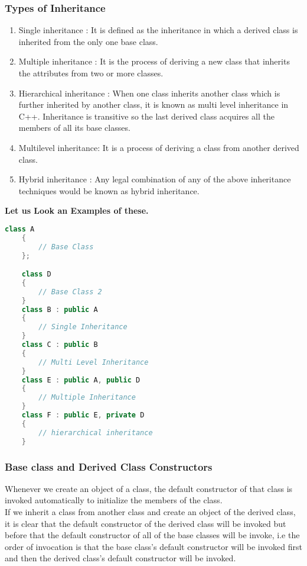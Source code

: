 \documentclass[11pt]{article}
\begin{document}
\subsubsection{Types of Inheritance}

\begin{enumerate}
	\item Single inheritance :
	      It is defined as the inheritance in which a derived class is inherited from the only one base class.
	\item Multiple inheritance : It is the process of deriving a new class that inherits the attributes from two or more classes.
	\item Hierarchical inheritance : When one class inherits another class which is further inherited by another class, it is known as multi level inheritance in C++. Inheritance is transitive so the last derived class acquires all the members of all its base classes.
	\item Multilevel inheritance: It is a process of deriving a class from another derived class.
	\item Hybrid inheritance : Any legal combination of any of the above inheritance techniques would be known as hybrid inheritance.
\end{enumerate}

\textbf{Let us Look an Examples of these.}
\begin{lstlisting}[language = C++]
	class A
	{
		// Base Class
	};

	class D
	{
		// Base Class 2
	}
	class B : public A
	{
		// Single Inheritance
	}
	class C : public B
	{
		// Multi Level Inheritance
	}
	class E : public A, public D
	{
		// Multiple Inheritance
	}
	class F : public E, private D
	{
		// hierarchical inheritance
	}
\end{lstlisting}

\subsubsection{Base class and Derived Class Constructors}
Whenever we create an object of a class, the default constructor of that class is invoked automatically to initialize the members of the class. \\

If we inherit a class from another class and create an object of the derived class, it is clear that the default constructor of the derived class will be invoked but before that the default constructor of all of the base classes will be invoke, i.e the order of invocation is that the base class's default constructor will be invoked first and then the derived class's default constructor will be invoked.\\
\end{document}

